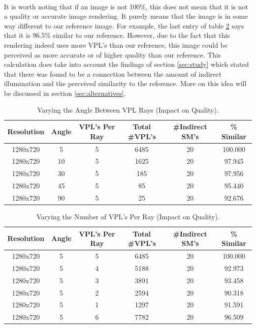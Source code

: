 \paragraph{}
It is worth noting that if an image is not 100\%, this does not mean that it is not a quality or accurate image rendering.  It purely means that the image is in some way different to our reference image.  For example, the last entry of table \ref{table:5.6} says that it is 96.5\% similar to our reference.  However, due to the fact that this rendering indeed uses more VPL's than our reference, this image could be perceived as more accurate or of higher quality than our reference.  This calculation does take into account the findings of section \ref{sec:study} which stated that there was found to be a connection between the amount of indirect illumination and the perceived similarity to the reference.  More on this idea will be discussed in section \ref{sec:alternatives}.
\vspace{5 mm}
\begin{table}[h!]\centering
	\caption{Varying the Angle Between VPL Rays (Impact on Quality).}
	\begin{center}
	    \begin{tabular}{ | c | c | c | c | c | c |}
	    \hline
	    Resolution & Angle & VPL's Per Ray & Total \#VPL's & \#Indirect SM's & \% Similar\\ \hline
	    1280x720 & 5 & 5 & 6485 & 20 & 100.000\\ \hline
	    1280x720 & 10 & 5 & 1625 & 20 & 97.945\\ \hline
	    1280x720 & 30 & 5 & 185 & 20 & 97.956\\ \hline
	    1280x720 & 45 & 5 & 85 & 20 & 95.440\\ \hline
	    1280x720 & 90 & 5 & 25 & 20 & 92.676\\ \hline
	    \end{tabular}
	\end{center}
	\label{table:5.5}
\end{table}
\begin{table}[h!]\centering
	\caption{Varying the Number of VPL's Per Ray (Impact on Quality).}
	\begin{center}
	    \begin{tabular}{ | c | c | c | c | c | c |}
	    \hline
	    Resolution & Angle & VPL's Per Ray & Total \#VPL's & \#Indirect SM's & \% Similar\\ \hline
	    1280x720 & 5 & 5 & 6485 & 20 & 100.000\\ \hline
	    1280x720 & 5 & 4 & 5188 & 20 & 92.973\\ \hline
	    1280x720 & 5 & 3 & 3891 & 20 & 93.458\\ \hline
	    1280x720 & 5 & 2 & 2594 & 20 & 90.318\\ \hline
	    1280x720 & 5 & 1 & 1297 & 20 & 91.591\\ \hline
	    1280x720 & 5 & 6 & 7782 & 20 & 96.509\\ \hline
	    \end{tabular}
	\end{center}
	\label{table:5.6}
\end{table}

